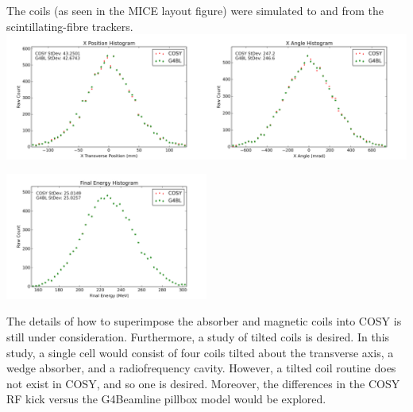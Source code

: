 \documentclass[portrait,a0paper,fontscale=0.285]{baposter} %
\begin{document}
\begin{poster}
{The coils (as seen in the MICE layout figure) were simulated to and from the scintillating-fibre trackers.\\
\includegraphics[width=0.5\textwidth]{Figures/coil tests/xposition}\includegraphics[width=0.5\textwidth]{Figures/coil tests/xangle}
\begin{center} \includegraphics[width=0.5\textwidth]{Figures/coil tests/energy} \end{center}

}


{
The details of how to superimpose the absorber and magnetic coils into COSY is still under consideration. Furthermore, a study of tilted coils is desired. In this study, a single cell would consist of four coils tilted about the transverse axis, a wedge absorber, and a radiofrequency cavity. However, a tilted coil routine does not exist in COSY, and so one is desired. Moreover, the differences in the COSY RF kick versus the G4Beamline pillbox model would be explored.
}


{\tiny
\renewcommand{\section}[2]{}%
{}

}

\end{poster}
\end{document}
